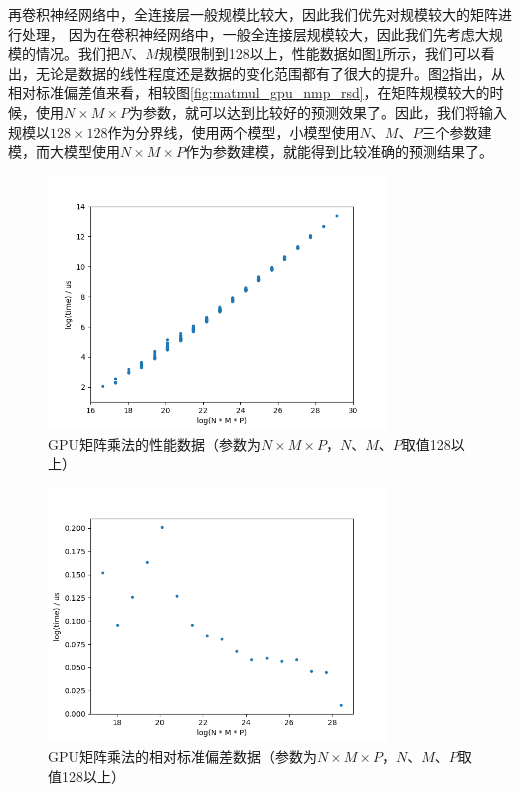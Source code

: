     再卷积神经网络中，全连接层一般规模比较大，因此我们优先对规模较大的矩阵进行处理，
    因为在卷积神经网络中，一般全连接层规模较大，因此我们先考虑大规模的情况。我们把$ N $、$ M $规模限制到128以上，性能数据如图\ref{fig:matmul_gpu_nmp_big}所示，我们可以看出，无论是数据的线性程度还是数据的变化范围都有了很大的提升。图\ref{fig:matmul_gpu_nmp_rsd_big}指出，从相对标准偏差值来看，相较图\ref{fig:matmul_gpu_nmp_rsd}，在矩阵规模较大的时候，使用$ N \times M \times P $为参数，就可以达到比较好的预测效果了。因此，我们将输入规模以$128 \times 128$作为分界线，使用两个模型，小模型使用$ N $、$ M $、$ P $三个参数建模，而大模型使用$ N \times M \times P $作为参数建模，就能得到比较准确的预测结果了。

    \begin{figure}[!htbp]
        \centering
        \includegraphics[width=0.8\textwidth]{figures/matmul_gpu_nmp_big.png}
        \caption{GPU矩阵乘法的性能数据（参数为$N \times M \times P $，$ N $、$ M $、$ P $取值128以上）}
        \label{fig:matmul_gpu_nmp_big}
    \end{figure}

    \begin{figure}[!htbp]
        \centering
        \includegraphics[width=0.8\textwidth]{figures/matmul_gpu_nmp_rsd_big.png}
        \caption{GPU矩阵乘法的相对标准偏差数据（参数为$ N \times M \times P $，$ N $、$ M $、$ P $取值128以上）}
        \label{fig:matmul_gpu_nmp_rsd_big}
    \end{figure}

